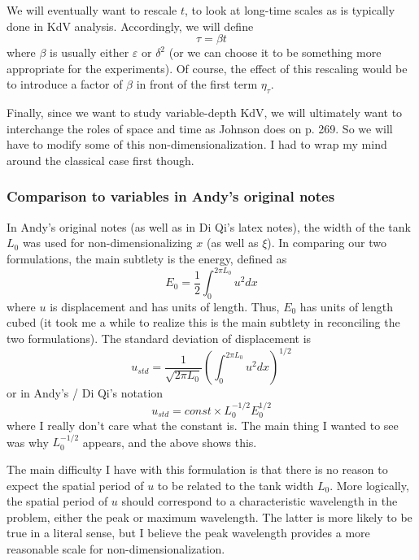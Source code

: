 \documentclass[12pt]{article}
\newcommand{\eps}{\varepsilon}
\begin{document}
We will eventually want to rescale $t$, to look at long-time scales as is typically done in KdV analysis. Accordingly, we will define
\begin{equation}
\tau = \beta t
\end{equation}
where $\beta$ is usually either $\eps$ or $\delta^2$ (or we can choose it to be something more appropriate for the experiments). Of course, the effect of this rescaling would be to introduce a factor of $\beta$ in front of the first term $\eta_{\tau}$.

Finally, since we want to study variable-depth KdV, we will ultimately want to interchange the roles of space and time as Johnson does on p. 269. So we will have to modify some of this non-dimensionalization. I had to wrap my mind around the classical case first though.

\subsubsection{Comparison to variables in Andy's original notes}
In Andy's original notes (as well as in Di Qi's latex notes), the width of the tank $L_0$ was used for non-dimensionalizing $x$ (as well as $\xi$). In comparing our two formulations, the main subtlety is the energy, defined as
\begin{equation}
E_0 = \frac{1}{2} \int_{0}^{2 \pi L_0} u^2 dx
\end{equation}
where $u$ is displacement and has units of length. Thus, $E_0$ has units of length cubed (it took me a while to realize this is the main subtlety in reconciling the two formulations). The standard deviation of displacement is
\begin{equation}
u_{std} = \frac{1}{\sqrt{2 \pi L_0}} \left( \int_{0}^{2\pi L_0} u^2 dx \right)^{1/2}
\end{equation}
or in Andy's / Di Qi's notation
\begin{equation}
u_{std} = const \times L_0^{-1/2} E_0^{1/2}
\end{equation}
where I really don't care what the constant is. The main thing I wanted to see was why $L_0^{-1/2}$ appears, and the above shows this.

The main difficulty I have with this formulation is that there is no reason to expect the spatial period of $u$ to be related to the tank width $L_0$. More logically, the spatial period of $u$ should correspond to a characteristic wavelength in the problem, either the peak or maximum wavelength. The latter is more likely to be true in a literal sense, but I believe the peak wavelength provides a more reasonable scale for non-dimensionalization.
\end{document}
